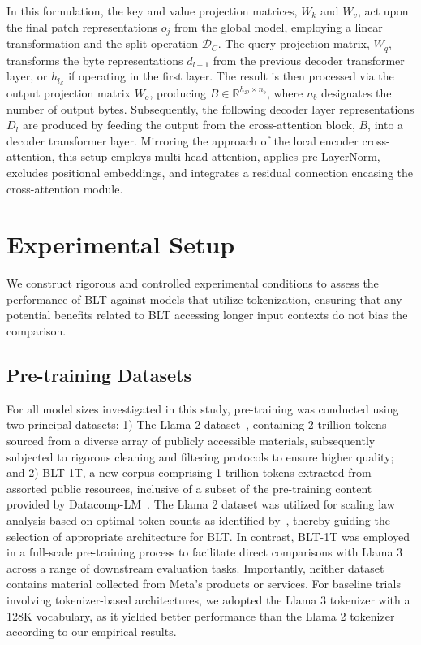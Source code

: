 In this formulation, the key and value projection matrices, $W_k$ and $W_v$, act upon the final patch representations $o_j$ from the global model, employing a linear transformation and the split operation $\mathcal{D}_C$. The query projection matrix, $W_q$, transforms the byte representations $d_{l-1}$ from the previous decoder transformer layer, or $h_{l_{\mathcal{E}}}$ if operating in the first layer. The result is then processed via the output projection matrix $W_o$, producing $B \in \mathbb{R}^{h_{\mathcal{D}} \times n_b}$, where $n_b$ designates the number of output bytes. Subsequently, the following decoder layer representations $D_l$ are produced by feeding the output from the cross-attention block, $B$, into a decoder transformer layer. Mirroring the approach of the local encoder cross-attention, this setup employs multi-head attention, applies pre LayerNorm, excludes positional embeddings, and integrates a residual connection encasing the cross-attention module.

\section{Experimental Setup}
\label{section:experiments}
We construct rigorous and controlled experimental conditions to assess the performance of {\textsc BLT} against models that utilize tokenization, ensuring that any potential benefits related to {\textsc BLT} accessing longer input contexts do not bias the comparison.

\subsection{Pre-training Datasets} For all model sizes investigated in this study, pre-training was conducted using two principal datasets: 1) The Llama 2 dataset~\citep{touvron2023llama}, containing 2 trillion tokens sourced from a diverse array of publicly accessible materials, subsequently subjected to rigorous cleaning and filtering protocols to ensure higher quality; and 2) {\textsc BLT}-1T, a new corpus comprising 1 trillion tokens extracted from assorted public resources, inclusive of a subset of the pre-training content provided by Datacomp-LM~\citep{li2024datacomp}. The Llama 2 dataset was utilized for scaling law analysis based on optimal token counts as identified by~\cite{dubey2024llama}, thereby guiding the selection of appropriate architecture for {\textsc BLT}. In contrast, {\textsc BLT}-1T was employed in a full-scale pre-training process to facilitate direct comparisons with Llama 3 across a range of downstream evaluation tasks. Importantly, neither dataset contains material collected from Meta’s products or services. For baseline trials involving tokenizer-based architectures, we adopted the Llama 3 tokenizer with a 128K vocabulary, as it yielded better performance than the Llama 2 tokenizer according to our empirical results.

